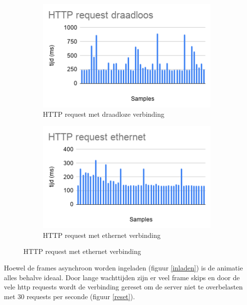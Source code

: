 \begin{figure} [H]
	\centering
	\begin{subfigure} [b] {0.45\textwidth}
		\centering
		\includegraphics [width=\textwidth] {img/draadloos.png}
		\caption{HTTP request met draadloze verbinding} \label{draadloos}
	\end{subfigure}
	\begin{subfigure} [b] {0.45\textwidth}
		\centering
		\includegraphics [width=\textwidth] {img/ethernet.png}
		\caption{HTTP request met ethernet verbinding} \label{ethernet}
	\end{subfigure}
\end{figure}

Hoewel de frames asynchroon worden ingeladen (figuur \ref{inladen}) is de animatie alles behalve ideaal. Door lange wachttijden zijn er veel frame skips en door de vele http requests wordt de verbinding gereset om de server niet te overbelasten met 30 requests per seconde (figuur \ref{reset}).

